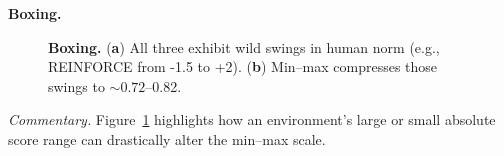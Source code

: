 \noindent \textbf{Boxing.}
\begin{figure}[htbp]
	\centering
	\quad
	\caption{\textbf{Boxing.}
		(\textbf{a}) All three exhibit wild swings in human norm (e.g., REINFORCE from -1.5 to +2).
		(\textbf{b}) Min--max compresses those swings to \(\sim0.72\)--0.82.}
	\label{fig:boxing_combined}
\end{figure}

\noindent
\emph{Commentary.} Figure~\ref{fig:boxing_combined} highlights how an environment’s large or small absolute score range can drastically alter the min--max scale.

\medskip

